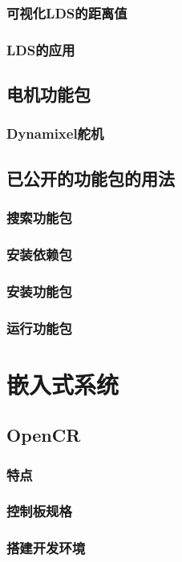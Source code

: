 \documentclass[geye,green,kindle,cn]{elegantnote}
\begin{document}
\subsubsection{可视化LDS的距离值}
\subsubsection{LDS的应用}
\subsection{电机功能包}
\subsubsection{Dynamixel舵机}
\subsection{已公开的功能包的用法}
\subsubsection{搜索功能包}
\subsubsection{安装依赖包}
\subsubsection{安装功能包}
\subsubsection{运行功能包}
\section{嵌入式系统}
\subsection{OpenCR}
\subsubsection{特点}
\subsubsection{控制板规格}
\subsubsection{搭建开发环境}
\end{document}
